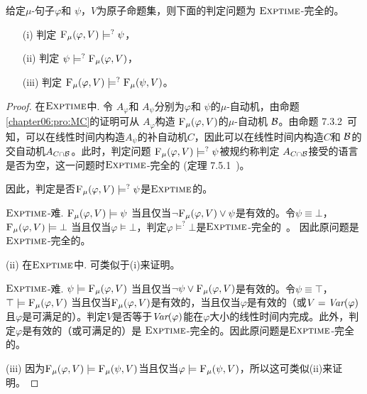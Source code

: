 \begin{theorem}[Entailment]
	\label{thm:Ent}
	给定$\mu$-句子$\varphi$和 $\psi$，$V$为原子命题集，则下面的判定问题为 $\textsc{Exptime}$-完全的。
	\begin{itemize}
		\item[(i)] 判定  ${\textsc{F}_{\textsc{$\mu$}}}(\varphi, V ) \models^? \psi$，
		\item[(ii)] 判定  $\psi \models^? {\textsc{F}_{\textsc{$\mu$}}}(\varphi, V)$，
		\item[(iii)] 判定 ${\textsc{F}_{\textsc{$\mu$}}}(\varphi, V) \models^? {\textsc{F}_{\textsc{$\mu$}}}(\psi, V)$。
	\end{itemize}
\end{theorem}
\begin{proof}	
	在$\textsc{Exptime}$中. 令 $A_{\varphi}$和 $A_{\psi}$分别为$\varphi$和 $\psi$的$\mu$-自动机，由命题\ref{chapter06:pro:MC}的证明可从 $A_{\varphi}$构造 ${\textsc{F}_{\textsc{$\mu$}}}(\varphi, V )$的$\mu$-自动机 ${\cal B}$。由命题 7.3.2~\cite{comon1997tree}可知，可以在线性时间内构造$A_\psi$的补自动机$C$，因此可以在线性时间内构造$C$和 ${\cal B}$的交自动机$A_{C \cap {\cal B}}$。此时，判定问题 ${\textsc{F}_{\textsc{$\mu$}}}(\varphi, V ) \models^? \psi$被规约称判定 $A_{C \cap {\cal B}}$接受的语言是否为空，这一问题时$\textsc{Exptime}$-完全的 (定理 7.5.1~\cite{comon1997tree})。
	
	因此，判定是否${\textsc{F}_{\textsc{$\mu$}}}(\varphi, V ) \models^? \psi$是$\textsc{Exptime}$的。 
	
	$\textsc{Exptime}$-难. ${\textsc{F}_{\textsc{$\mu$}}}(\varphi, V ) \models \psi$ 当且仅当$\neg {\textsc{F}_{\textsc{$\mu$}}}(\varphi, V) \vee \psi$是有效的。令$\psi \equiv \bot$， ${\textsc{F}_{\textsc{$\mu$}}}(\varphi, V ) \models \bot$ 当且仅当$\varphi \models \bot$，判定$\varphi \models^? \bot$是$\textsc{Exptime}$-完全的~\cite{bradfield2018mu}。
	因此原问题是$\textsc{Exptime}$-完全的。
	
	
	(ii) 在$\textsc{Exptime}$中. 可类似于(i)来证明。 
	
	$\textsc{Exptime}$-难.   $\psi \models {\textsc{F}_{\textsc{$\mu$}}}(\varphi, V)$  当且仅当$\neg \psi \vee {\textsc{F}_{\textsc{$\mu$}}}(\varphi, V)$是有效的。令$\psi \equiv \top$，$\top \models {\textsc{F}_{\textsc{$\mu$}}}(\varphi, V)$ 当且仅当${\textsc{F}_{\textsc{$\mu$}}}(\varphi,V)$是有效的，当且仅当$\varphi$是有效的（或$V =\textit{Var}(\varphi)$且$\varphi$是可满足的）。判定$V$是否等于$\textit{Var}(\varphi)$能在$\varphi$大小的线性时间内完成。此外，判定$\varphi$是有效的（或可满足的）是 $\textsc{Exptime}$-完全的。因此原问题是$\textsc{Exptime}$-完全的。 
	
	(iii) 因为${\textsc{F}_{\textsc{$\mu$}}}(\varphi, V) \models {\textsc{F}_{\textsc{$\mu$}}}(\psi, V)$当且仅当$\varphi \models {\textsc{F}_{\textsc{$\mu$}}}(\psi, V)$，所以这可类似(ii)来证明。
\end{proof}

